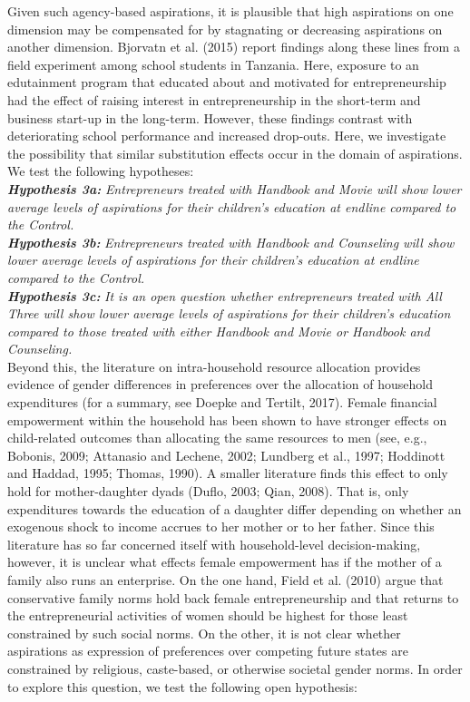 \documentclass[11.5pt]{article}
\begin{document}
Given such agency-based aspirations, it is plausible that high aspirations on one dimension may be compensated for by stagnating or decreasing aspirations on another dimension. Bjorvatn et al. (2015) report findings along these lines from a field experiment among school students in Tanzania. Here, exposure to an edutainment program that educated about and motivated for entrepreneurship had the effect of raising interest in entrepreneurship in the short-term and business start-up in the long-term. However, these findings contrast with deteriorating school performance and increased drop-outs. Here, we investigate the possibility that similar substitution effects occur in the domain of aspirations. We test the following hypotheses:\\

\noindent \emph{\textbf{Hypothesis 3a:}} \emph{Entrepreneurs treated with \emph{Handbook and Movie} will show lower average levels of aspirations for their children's education at endline compared to the \emph{Control}.} \\

\noindent \emph{\textbf{Hypothesis 3b:}} \emph{Entrepreneurs treated with \emph{Handbook and Counseling} will show lower average levels of aspirations for their children's education at endline compared to the \emph{Control}.} \\

\noindent \emph{\textbf{Hypothesis 3c:}} \emph{It is an open question whether entrepreneurs treated with \emph{All Three} will show lower average levels of aspirations for their children's education compared to those treated with either \emph{Handbook and Movie} or \emph{Handbook and Counseling}.} \\

Beyond this, the literature on intra-household resource allocation provides evidence of gender differences in preferences over the allocation of household expenditures (for a summary, see Doepke and Tertilt, 2017). Female financial empowerment within the household has been shown to have stronger effects on child-related outcomes than allocating the same resources to men (see, e.g., Bobonis, 2009; Attanasio and Lechene, 2002; Lundberg et al., 1997; Hoddinott and Haddad, 1995; Thomas, 1990). A smaller literature finds this effect to only hold for mother-daughter dyads (Duflo, 2003; Qian, 2008). That is, only expenditures towards the education of a daughter differ depending on whether an exogenous shock to income accrues to her mother or to her father. Since this literature has so far concerned itself with household-level decision-making, however, it is unclear what effects female empowerment has if the mother of a family also runs an enterprise. On the one hand, Field et al. (2010) argue that conservative family norms hold back female entrepreneurship and that returns to the entrepreneurial activities of women should be highest for those least constrained by such social norms. On the other, it is not clear whether aspirations as expression of preferences over competing future states are constrained by religious, caste-based, or otherwise societal gender norms. In order to explore this question, we test the following open hypothesis:\\
\end{document}
